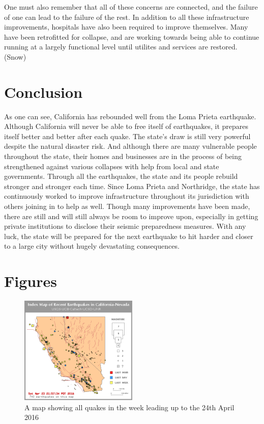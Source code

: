 \documentclass[12pt]{article}
\begin{document}
One must also remember that all of these concerns are connected, and the failure of one can lead to the failure of the rest.  In addition to all these infrastructure improvements, hospitals have also been required to improve themselves.  Many have been retrofitted for collapse, and are working towards being able to continue running at a largely functional level until utilites and services are restored. (Snow)

\section*{Conclusion}

As one can see, California has rebounded well from the Loma Prieta earthquake.  Although California will never be able to free itself of earthquakes, it prepares itself better and better after each quake.  The state's draw is still very powerful despite the natural disaster risk.  And although there are many vulnerable people throughout the state, their homes and businesses are in the process of being strengthened against various collapses with help from local and state governments.  Through all the earthquakes, the state and its people rebuild stronger and stronger each time.  Since Loma Prieta and Northridge, the state has continuously worked to improve infrastructure throughout its jurisdiction with others joining in to help as well.  Though many improvements have been made, there are still and will still always be room to improve upon, especially in getting private institutions to disclose their seismic preparedness measures.  With any luck, the state will be prepared for the next earthquake to hit harder and closer to a large city without hugely devastating consequences.

\pagebreak
\section*{Figures}
\begin{figure}[!h]
    \centering
    \includegraphics[width=0.5\textwidth]{recentquakes.png}
    \caption{A map showing all quakes in the week leading up to the 24th April 2016}
    \label{fig:lastweek}
\end{figure}
\end{document}
